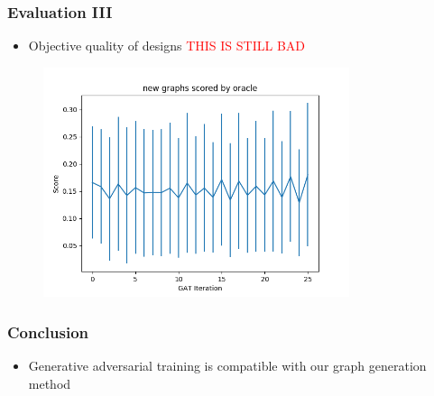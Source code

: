\documentclass{beamer}
\newcommand{\red}[1]{\textcolor{red}{#1}}
\begin{document}
\begin{frame}
    \frametitle{Evaluation III}
    \begin{itemize}
        \item Objective quality of designs \red{THIS IS STILL BAD}
    \end{itemize}

   \begin{figure}[ht]
        \centering
        \includegraphics[width=0.80\textwidth]{images/eval1.png}
    \end{figure}
\end{frame}




\begin{frame}
    \frametitle{Conclusion}
    
    \begin{itemize}
        \item Generative adversarial training is  compatible with our 
            graph generation method
    \end{itemize}

\end{frame}
\end{document}
